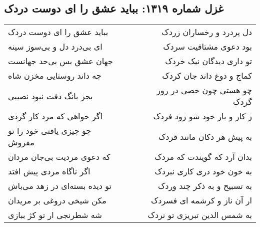 \begin{center}
\section*{غزل شماره ۱۳۱۹: بباید عشق را ای دوست دردک}
\label{sec:1319}
\begin{longtable}{l p{0.5cm} r}
بباید عشق را ای دوست دردک
&&
دل پردرد و رخساران زردک
\\
ای بی‌درد دل و بی‌سوز سینه
&&
بود دعوی مشتاقیت سردک
\\
جهان عشق بس بی‌حد جهانست
&&
تو داری دیدگان نیک خردک
\\
چه داند روستایی مخزن شاه
&&
کماج و دوغ داند جان کردک
\\
بجز بانگ دفت نبود نصیبی
&&
چو هستی چون خصی در روز گردک
\\
اگر خواهی که مرد کار گردی
&&
ز کار و بار خود شو زود فردک
\\
چو چیزی یافتی خود را تو مفروش
&&
به پیش هر دکان مانند قردک
\\
که دعوی مردیت بی‌جان مردان
&&
بدان آرد که گویندت که مردک
\\
اگر ناگاه مردی پیش افتد
&&
به خون خود دری کاری نبردک
\\
تو دیده بسته‌ای در زهد می‌باش
&&
به تسبیح و به ذکر چند وردک
\\
مکن شیخی دروغی بر مریدان
&&
ار آن ناز و کرشمه ای فسردک
\\
شه شطرنجی ار تو کژ ببازی
&&
به شمس الدین تبریزی تو نردک
\\
\end{longtable}
\end{center}
